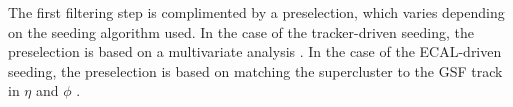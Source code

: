 The first filtering step is complimented by a preselection, which varies
depending on the seeding algorithm used.  In the case of the tracker-driven
seeding, the preselection is based on a multivariate analysis \cite{pf-1}.
In the case of the ECAL-driven seeding, the preselection is based on
matching the supercluster to the GSF track in $\eta$ and $\phi$ \cite{electron-1}.
